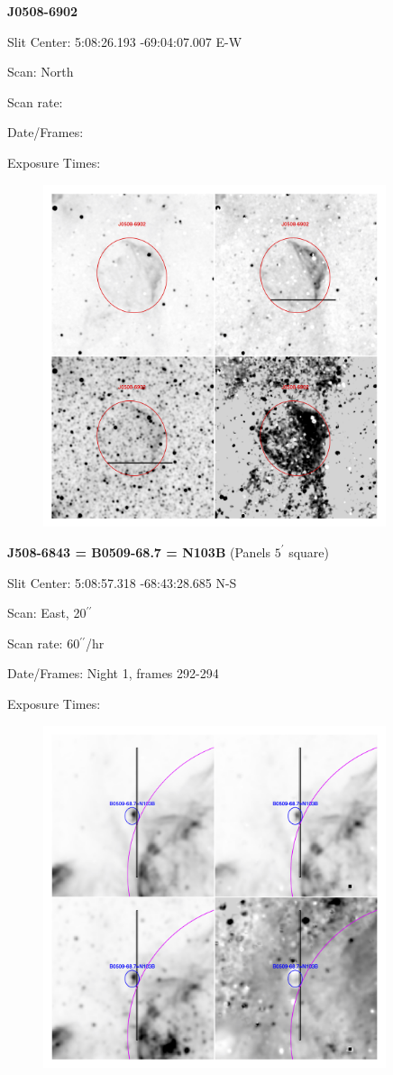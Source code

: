 \documentclass[11pt]{article}
\newcommand{\arcsec}{$^{\prime\prime}$}
\begin{document}
\newpage
{\bf J0508-6902}  
 
Slit Center:   5:08:26.193   -69:04:07.007     E-W

Scan:  North

Scan rate:  

Date/Frames:

Exposure Times:  

\begin{figure}
\includegraphics[width=10.05cm]{snapshots/J0508-6902.png}
\end{figure}

\newpage
{\bf J508-6843 = B0509-68.7 = N103B}  (Panels $5^\prime$ square)
 
Slit Center:   5:08:57.318   -68:43:28.685     N-S 

Scan:  East, 20\arcsec

Scan rate:   60\arcsec/hr

Date/Frames:  Night 1, frames 292-294

Exposure Times:  

\begin{figure}
\includegraphics[width=10.05cm]{snapshots/N103B_5arcmin.png}
\end{figure}
\end{document}
